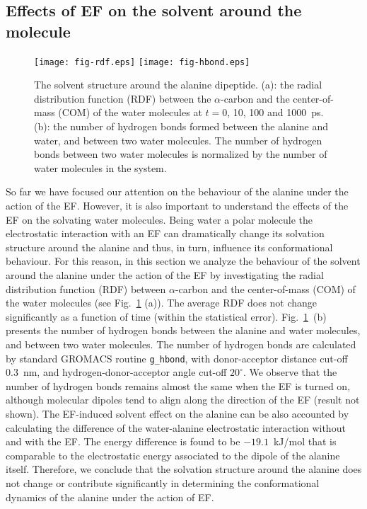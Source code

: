 \documentclass[a4paper,preprint,unsortedaddress,onecolumn]{revtex4-1}
\begin{document}
\subsection{Effects of EF on the solvent around the molecule}

\begin{figure}
  \centering
  \texttt{[image: fig-rdf.eps]}
  \texttt{[image: fig-hbond.eps]}
  \caption{The solvent structure around the alanine dipeptide.  
    (a): the radial distribution function (RDF) between the
    $\alpha$-carbon and the center-of-mass (COM) of the water molecules at
    $t = 0$, 10, 100 and 1000~ps.  (b): the number of hydrogen
    bonds formed between the alanine and water, and between two water
    molecules.  The number of hydrogen bonds between two water
    molecules is normalized by the number of water molecules in the
    system. 
  }
  \label{fig:tmp7a}
\end{figure}
So far we have focused our attention on the behaviour of the alanine
under the action of the EF. However, it is also important to understand
the effects of the EF on the solvating water molecules. Being water a
polar molecule the electrostatic interaction with an EF can
dramatically change its solvation structure around the alanine and
thus, in turn, influence its conformational behaviour. For this
reason, in this section we analyze the behaviour of the solvent around
the alanine under the action of the EF by investigating
the radial distribution function (RDF) between $\alpha$-carbon and the
center-of-mass (COM) of the water molecules
(see Fig.~\ref{fig:tmp7a} (a)). The average
RDF does not change significantly as a function of time
(within the statistical error). 
Fig.~\ref{fig:tmp7a}~(b) presents the number of hydrogen bonds between the
alanine and water molecules, and between two water molecules.
The number of hydrogen bonds are calculated by standard GROMACS
routine {\texttt {g\_hbond}}, with donor-acceptor distance cut-off 0.3~nm,
and hydrogen-donor-acceptor angle cut-off $20^{\circ}$.
We observe that the
number of hydrogen bonds remains almost the same when the EF is turned on,
although molecular dipoles tend to align along the direction of the EF (result
not shown). 
The EF-induced solvent effect on the alanine can be also accounted by calculating the
difference of the water-alanine electrostatic interaction 
without and with the EF.
The energy difference is found to be $-19.1$~kJ/mol that is
comparable to the electrostatic energy associated to the dipole of the alanine itself.
Therefore, we conclude that the solvation structure around the
alanine does not change or contribute significantly in determining the conformational dynamics of the alanine under the action of EF.
\end{document}
